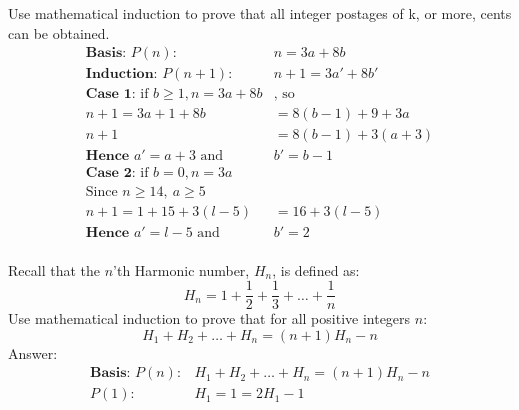 \documentclass[landscape, letterpaper, 8pt]{extarticle}
\begin{document}
\begin{multicols}{3}
\begin{example}
        Use mathematical induction to prove that all integer postages of k, or more, cents can be
        obtained.
        \begin{equation*}
            \begin{aligned}
                \textbf{Basis: } P(n):                             & n = 3a + 8b       \\
                \textbf{Induction: } P(n+1):                       & n+1 = 3a' + 8b'   \\
                \textbf{Case 1: } \text{if } b \geq 1, n = 3a + 8b & \text{, so}       \\
                n+1 = 3a+1+8b                                      & = 8(b-1) + 9 + 3a \\
                n+1                                                & = 8(b-1) +3(a+3)  \\
                \textbf{Hence }a' = a+3      \text{ and }          & b' = b - 1        \\
                \textbf{Case 2: } \text{if } b = 0, n = 3a         &                   \\
                \text{Since }n \geq 14,~a \geq 5                                       \\
                n+1 = 1 + 15 + 3(l-5)                              & = 16+ 3(l-5)      \\
                \textbf{Hence }a' = l-5      \text{ and }          & b' = 2            \\
            \end{aligned}
        \end{equation*}
    \end{example}
    \begin{example}
        Recall that the $n$'th Harmonic number, $H_n$, is defined as:
        \[
            H_n = 1+ \frac{1}{2} + \frac{1}{3} + \ldots + \frac{1}{n}
        \]
        Use mathematical induction to prove that for all positive integers $n$:
        \[
            H_1 + H_2 + \ldots + H_n = (n+1)H_n -n
        \]
        Answer:
        \begin{equation*}
            \begin{aligned}
                \textbf{Basis: } P(n): & H_1 + H_2 + \ldots + H_n = (n+1) H_n-n \\
                P(1):                  & H_1 = 1 = 2H_1 -1                      \\
            \end{aligned}
        \end{equation*}

\end{example}
\end{multicols}
\end{document}
